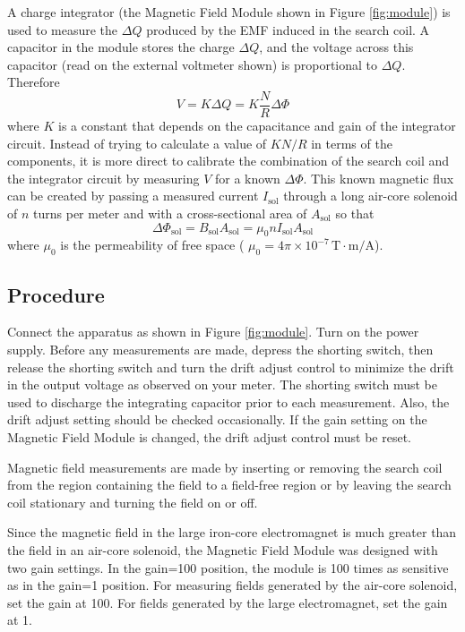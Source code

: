 A charge integrator (the Magnetic Field Module shown in Figure {\ref{fig:module}}) is used to measure the $\Delta Q$ produced by the EMF induced in the search coil. A capacitor in the module stores the charge $\Delta Q$, and the voltage across this capacitor (read on the external voltmeter shown) is proportional to $\Delta Q$. Therefore
\begin{equation}
  V=K\Delta Q=K\frac{N}{R}\Delta \Phi
\end{equation}
where $K$ is a constant that depends on the capacitance and gain of the integrator circuit. Instead of trying to calculate a value of $KN / R$ in terms of the components, it is more direct to calibrate the combination of the search coil and the integrator circuit by measuring $V$ for a known $\Delta \Phi$. This known magnetic flux can be created by passing a measured current $I_{\mathrm{sol}}$ through a long air-core solenoid of $n$ turns per meter and with a cross-sectional area of $A_{\mathrm{sol}}$ so that
\begin{equation}
  \Delta \Phi_{\mathrm{sol}}=B_{\mathrm{sol}}A_{\mathrm{sol}}=\mu_{0}nI_{\mathrm{sol}}A_{\mathrm{sol}}
\end{equation}
where $\mu_{0}$ is the permeability of free space ( $\mu_{0} = 4\pi \times 10^{-7}\, \mathrm{T}\cdot  \mathrm{m} / \mathrm{A} $).

\subsection{Procedure}
Connect the apparatus as shown in Figure {\ref{fig:module}}. Turn on the power supply. Before any measurements are made, depress the shorting switch, then release the shorting switch and turn the drift adjust control to minimize the drift in the output voltage as observed on your meter. The shorting switch must be used to discharge the integrating capacitor prior to each measurement. Also, the drift adjust setting should be checked occasionally. If the gain setting on the Magnetic Field Module is changed, the drift adjust control must be reset.\myskip

Magnetic field measurements are made by inserting or removing the search coil from the region containing the field to a field-free region or by leaving the search coil stationary and turning the field on or off.\myskip

Since the magnetic field in the large iron-core electromagnet is much greater than the field in an air-core solenoid, the Magnetic Field Module was designed with two gain settings. In the gain=100 position, the module is 100 times as sensitive as in the gain=1 position. For measuring fields generated by the air-core solenoid, set the gain at 100. For fields generated by the large electromagnet, set the gain at 1.\myskip

